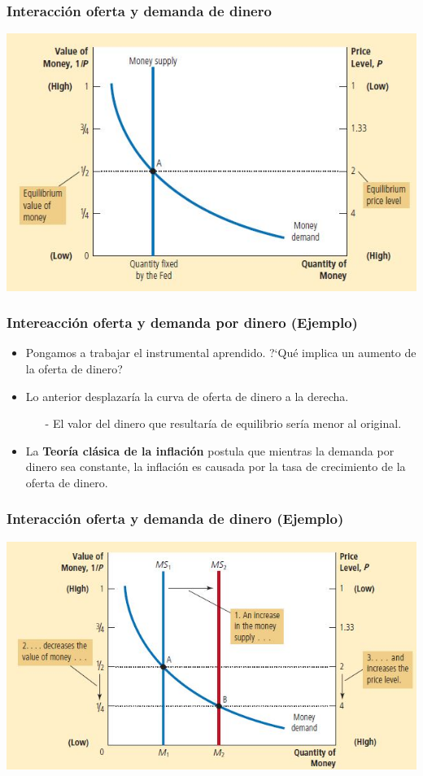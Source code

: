 \documentclass{beamer}
\begin{document}
\begin{frame}
\frametitle{Interacci\'on oferta y demanda de dinero}
\begin{center}
\includegraphics[scale=0.556]{Figuras/Equilibrio1}
\end{center}
\end{frame}

\begin{frame}
\frametitle{Intereacci\'on oferta y demanda por dinero (Ejemplo)}
\begin{itemize}
\setlength\itemsep{1.4em}
\item Pongamos a trabajar el instrumental aprendido. ?`Qu\'e implica un aumento de la oferta de dinero?
\item Lo anterior desplazar\'ia la curva de oferta de dinero a la derecha.\\
\begin{itemize}
\item[-] El valor del dinero que resultar\'ia de equilibrio ser\'ia menor al original.
\end{itemize}
\item La \textbf{Teor\'ia cl\'asica de la inflaci\'on} postula que mientras la demanda por dinero sea constante, la inflaci\'on es causada por la tasa de crecimiento de la oferta de dinero.
\end{itemize}
\end{frame}

\begin{frame}
\frametitle{Interacci\'on oferta y demanda de dinero (Ejemplo)}
\begin{center}
\includegraphics[scale=0.556]{Figuras/Equilibrio2}
\end{center}
\end{frame}
\end{document}
